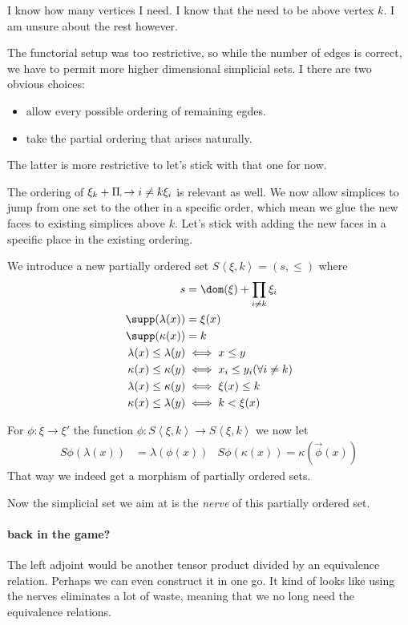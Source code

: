 \documentclass{tac}
\newcommand\of{:}
\newcommand\tuplet[1]{\left\langle #1 \right\rangle}
\newcommand\product[2]{\Pi #1 \mapsto #2}
\begin{document}
I know how many vertices I need. I know that the need to be above vertex $k$. I am unsure about the rest however.

The functorial setup was too restrictive, so while the number of edges is correct, we have to permit more higher dimensional simplicial sets.
I there are two obvious choices:
\begin{itemize}
\item allow every possible ordering of remaining egdes.
\item take the partial ordering that arises naturally.
\end{itemize}
The latter is more restrictive to let's stick with that one for now.

The ordering of $\xi_k + \product_{i\neq k}\xi_i$ is relevant as well.
We now allow simplices to jump from one set to the other in a specific order, which mean we glue the new faces to existing simplices above $k$.
Let's stick with adding the new faces in a specific place in the existing ordering.

We introduce a new partially ordered set $S\tuplet{\xi,k} = (s,\leq)$ where
\begin{align*}
s &= \dom(\xi) + \prod_{i\neq k} \xi_i\\
\supp(\lambda(x)) &= \xi(x) \\
\supp(\kappa(x)) &= k\\
\lambda(x) \leq \lambda(y) &\iff x\leq y \\
\kappa(x) \leq \kappa(y) &\iff x_i\leq y_i (\forall i\neq k)\\
\lambda(x)\leq \kappa(y) &\iff \xi(x) \leq k \\
\kappa(x) \leq \lambda(y) &\iff k < \xi(x)
\end{align*}

For $\phi:\xi\to \xi'$ the function $\phi\of S\tuplet{\xi,k} \to S\tuplet{\xi,k}$ we now let
\begin{align*} S\phi(\lambda(x)) &= \lambda(\phi(x)) & S\phi(\kappa(x)) = \kappa(\vec\phi(x)) \end{align*}
That way we indeed get a morphism of partially ordered sets.

Now the simplicial set we aim at is the \emph{nerve} of this partially ordered set.


\paragraph{back in the game?}

The left adjoint would be another tensor product divided by an equivalence relation. Perhaps we can even construct it in one go.
It kind of looks like using the nerves eliminates a lot of waste, meaning that we no long need the equivalence relations.
\end{document}
